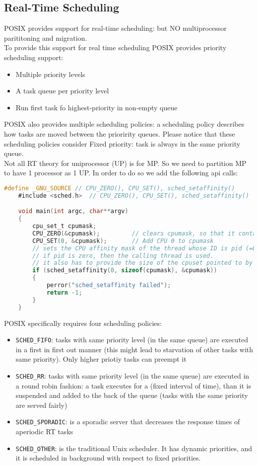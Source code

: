 \subsection{Real-Time Scheduling}
POSIX provides support for real-time scheduling: but NO multiprocessor parititoning and migration.\\
To provide this support for real time scheduling POSIX provides priority scheduling support:
\begin{itemize}
    \item Multiple priority levels
    \item A task queue per priority level
    \item Run first task fo highest-priority in non-empty queue
\end{itemize}
POSIX also provides multiple scheduling policies: a scheduling policy describes how tasks are moved between the prioririty queues. Please notice that these scheduling policies consider Fixed priority: task is always in the same priority queue.\\
Not all RT theory for uniprocessor (UP) is for MP. So we need to partition MP to have 1 processor as 1 UP.
In order to do so we add the following api calls:
\begin{lstlisting}[language=C]
    #define _GNU_SOURCE // CPU_ZERO(), CPU_SET(), sched_setaffinity()
    #include <sched.h>  // CPU_ZERO(), CPU_SET(), sched_setaffinity()

    void main(int argc, char**argv)
    {
        cpu_set_t cpumask;
        CPU_ZERO(&cpumask);         // clears cpumask, so that it contains no CPUs
        CPU_SET(0, &cpumask);       // Add CPU 0 to cpumask
        // sets the CPU affinity mask of the thread whose ID is pid (=0),
        // if pid is zero, then the calling thread is used.
        // it also has to provide the size of the cpuset pointed to by cpumask
        if (sched_setaffinity(0, sizeof(cpumask), &cpumask))
        {
            perror("sched_setaffinity failed");
            return -1;
        }
    }
\end{lstlisting}

POSIX specifically requires four scheduling policies:
\begin{itemize}
    \item \texttt{SCHED\_FIFO}: tasks with same priority level (in the same queue) are executed in a first in first out manner (this might lead to starvation of other tasks with same priority). Only higher priotiy tasks can preempt it
    \item \texttt{SCHED\_RR}: tasks with same priority level (in the same queue) are executed in a round robin fashion: a task executes for a  (fixed interval of time), than it is suspended and added to the back of the queue (tasks with the same priority are served fairly)
    \item \texttt{SCHED\_SPORADIC}: is a sporadic server that decreases the response times of aperiodic RT tasks
    \item \texttt{SCHED\_OTHER}: is the traditional Unix scheduler. It has dynamic priorities, and it is scheduled in background with respect to fixed priorities.
\end{itemize}

